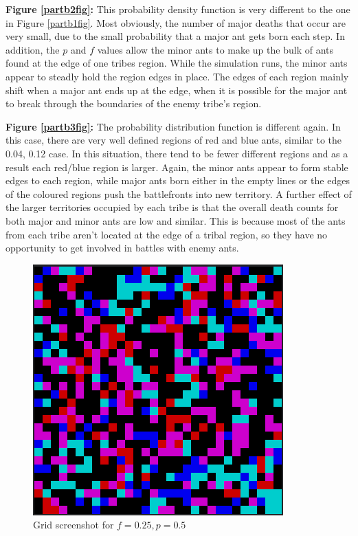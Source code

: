\begin{enumerate}
\textbf{Figure \ref{partb2fig}:} This probability density function is very
different to the one in Figure \ref{partb1fig}.  Most obviously, the number 
of major deaths that occur are very small, due to the small probability that
a major ant gets born each step.  In addition, the $p$ and $f$ values allow the
minor ants to make up the bulk of ants found at the edge of one tribes region.
While the simulation runs, the minor ants appear to steadly hold the 
region edges in place.  The edges of each region mainly shift when a major ant
ends up at the edge, when it is possible for the major ant to 
break through the boundaries of the enemy tribe's region.

\textbf{Figure \ref{partb3fig}:} The probability distribution function is
different again.  In this case, there are very well defined 
regions of red and blue ants, similar to the 0.04, 0.12 case.  In this 
situation, there tend to be fewer different regions and as a result each 
red/blue region is larger.  Again, the minor ants appear to form stable edges 
to each region, while major ants born either in the empty lines or the edges of 
the coloured regions push the battlefronts into new territory.  A further 
effect of the larger territories occupied by each tribe is that the overall 
death counts for both major and minor ants are low and similar.  This is 
because most of the ants from each tribe aren't located at the edge of a tribal 
region, so they have no opportunity to get involved in battles with enemy ants.

\begin{figure}[h!]
\centering
\includegraphics[scale=1.0]{partb1scrot1.png}
\caption{Grid screenshot for $f = 0.25, p = 0.5$}
\label{scrot1}
\end{figure}


\end{enumerate}
